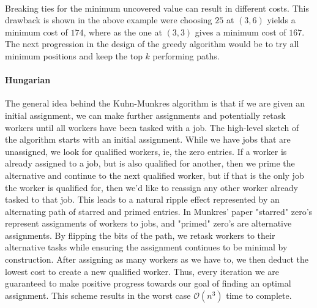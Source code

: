\documentclass{article}
\newcommand{\boundedBy}[1]{\mathcal{O} \left ( #1 \right )}
\begin{document}
\paragraph{} Breaking ties for the minimum uncovered value can result in different costs. This drawback is shown in the above example were choosing $25$ at $(3,6)$ yields a minimum cost of $174$, where as the one at $(3, 3)$ gives a minimum cost of $167$. The next progression in the design of the greedy algorithm would be to try all minimum positions and keep the top $k$ performing paths.

\paragraph{Hungarian} The general idea behind the Kuhn-Munkres algorithm is that if we are given an initial assignment, we can make further assignments and potentially retask workers until all workers have been tasked with a job. The high-level sketch of the algorithm starts with an initial assignment. While we have jobs that are unassigned, we look for qualified workers, ie, the zero entries. If a worker is already assigned to a job, but is also qualified for another, then we prime the alternative and continue to the next qualified worker, but if that is the only job the worker is qualified for, then we'd like to reassign any other worker already tasked to that job. This leads to a natural ripple effect represented by an alternating path of starred and primed entries. In Munkres' paper \cite{munkres1957algorithms} "starred" zero's represent assignments of workers to jobs, and "primed" zero's are alternative assignments. By flipping the bits of the path, we retask workers to their alternative tasks while ensuring the assignment continues to be minimal by construction. After assigning as many workers as we have to, we then deduct the lowest cost to create a new qualified worker. Thus, every iteration we are guaranteed to make positive progress towards our goal of finding an optimal assignment. This scheme results in the worst case $\boundedBy{n^3}$ time to complete.
\end{document}
